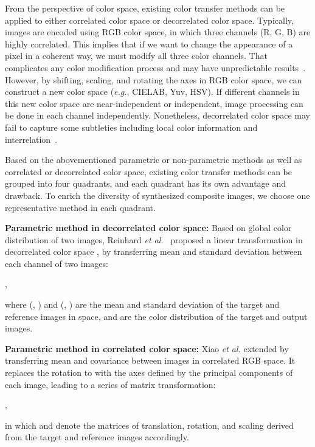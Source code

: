 \documentclass[10pt,twocolumn,letterpaper]{article}
\begin{document}
From the perspective of color space, existing color transfer methods can be applied to either correlated color space or decorrelated color space. Typically, images are encoded using RGB color space, in which three channels (R, G, B) are highly correlated. This implies that if we want to change the appearance of a pixel in a coherent way, we must modify all three color channels. That complicates any color modification process and may have unpredictable results~\cite{reinhard2001colorsupp}. However, by shifting, scaling, and rotating the axes in RGB color space, we can construct a new color space (\emph{e.g.}, CIELAB, Yuv, HSV). If different channels in this new color space are near-independent or independent, image processing can be done in each channel independently. Nonetheless, decorrelated color space may fail to capture some subtleties including local color information and interrelation~\cite{xiao2006colorsupp}.

Based on the abovementioned parametric or non-parametric methods as well as correlated or decorrelated color space, existing color transfer methods can be grouped into four quadrants, and each quadrant has its own advantage and drawback. To enrich the diversity of synthesized composite images, we choose one representative method in each quadrant.


\textbf{Parametric method in decorrelated color space: }
Based on global color distribution of two images, Reinhard \textit{et al.}~\cite{reinhard2001colorsupp} proposed a linear transformation in decorrelated color space , by transferring mean and standard deviation between each channel of two images:
\begin{center}
,
\end{center}
\iffalse Here, the subscripts , and  correspond to the target, reference and output image, and  and  denote mean and standard deviation. After this process, the transferred target image is rotated back to RGB color space to apply the reference statistics. \fi
where (, ) and (, ) are the mean and standard deviation of the target and reference images in  space,  and  are the color distribution of the target and output images.

\textbf{Parametric method in correlated color space: }
Xiao \textit{et al.} \cite{xiao2006colorsupp} extended \cite{reinhard2001colorsupp} by transferring mean and covariance between images in correlated RGB space. It replaces the rotation to  with the axes defined by the principal components of each image, leading to a series of matrix transformation:
\begin{center}
,
\end{center}
in which  and  denote the matrices of translation, rotation, and scaling derived from the target and reference images accordingly.
\end{document}
